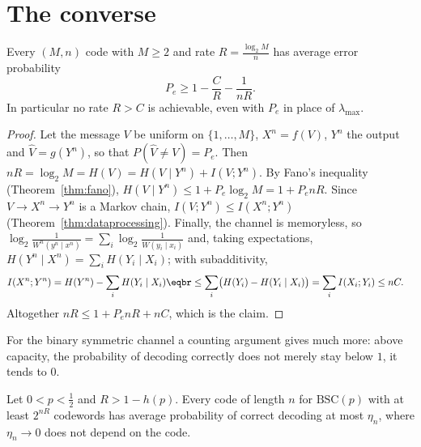\section{The converse}\label{sec:converse}

\begin{theorem}[converse]\label{thm:converse}
Every $(M,n)$ code with $M\ge2$ and rate $R=\frac{\log_2M}n$ has average error probability
\[
P_e\ge1-\frac CR-\frac1{nR}.
\]
In particular no rate $R>C$ is achievable, even with $P_e$ in place of $\lambda_{\max}$.
\end{theorem}

\begin{proof}
Let the message $V$ be uniform on $\{1,\dots,M\}$, $X^n=f(V)$, $Y^n$ the output and $\hat V=g(Y^n)$, so that $P(\hat V\ne V)=P_e$. Then $nR=\log_2M=H(V)=H(V\mid Y^n)+I(V;Y^n)$. By Fano's inequality (Theorem~\ref{thm:fano}), $H(V\mid Y^n)\le1+P_e\log_2M=1+P_enR$. Since $V\to X^n\to Y^n$ is a Markov chain, $I(V;Y^n)\le I(X^n;Y^n)$ (Theorem~\ref{thm:dataprocessing}). Finally, the channel is memoryless, so $\log_2\frac1{W^n(y^n\mid x^n)}=\sum_i\log_2\frac1{W(y_i\mid x_i)}$ and, taking expectations, $H(Y^n\mid X^n)=\sum_iH(Y_i\mid X_i)$; with subadditivity,
\[
\begin{aligned}I(X^n;Y^n)&=H(Y^n)-\sum_iH(Y_i\mid X_i)\eqbr\le\sum_i\bigl(H(Y_i)-H(Y_i\mid X_i)\bigr)=\sum_iI(X_i;Y_i)\le nC.\end{aligned}
\]
Altogether $nR\le1+P_enR+nC$, which is the claim.
\end{proof}

For the binary symmetric channel a counting argument gives much more: above capacity, the probability of decoding correctly does not merely stay below $1$, it tends to $0$.

\begin{theorem}\label{thm:strongconverse}
Let $0<p<\frac12$ and $R>1-h(p)$. Every code of length $n$ for $\mathrm{BSC}(p)$ with at least $2^{nR}$ codewords has average probability of correct decoding at most $\eta_n$, where $\eta_n\to0$ does not depend on the code.
\end{theorem}

